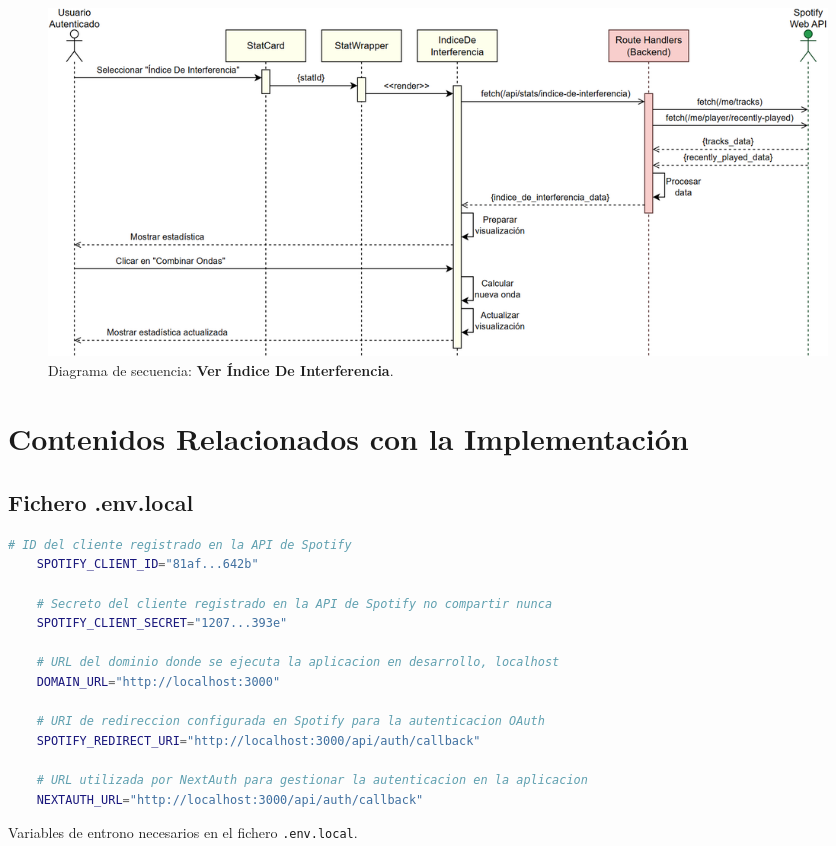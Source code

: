 \begin{figure}[H]
    \centering
    \includegraphics[width=\textwidth]{figures/diagramas_secuencia/ds_ver_indice_de_interferencia.png}
    \caption{Diagrama de secuencia: \textbf{Ver Índice De Interferencia}.}
    \label{fig:ds_ver_indice_de_interferencia}
\end{figure}

\chapter{Contenidos Relacionados con la Implementación} \label{ch:anexoC}

\section*{Fichero .env.local}

\begin{ifalgorithm}[H]
    \begin{lstlisting}[language=bash]
    # ID del cliente registrado en la API de Spotify
    SPOTIFY_CLIENT_ID="81af...642b"

    # Secreto del cliente registrado en la API de Spotify no compartir nunca
    SPOTIFY_CLIENT_SECRET="1207...393e"

    # URL del dominio donde se ejecuta la aplicacion en desarrollo, localhost
    DOMAIN_URL="http://localhost:3000"

    # URI de redireccion configurada en Spotify para la autenticacion OAuth
    SPOTIFY_REDIRECT_URI="http://localhost:3000/api/auth/callback"

    # URL utilizada por NextAuth para gestionar la autenticacion en la aplicacion
    NEXTAUTH_URL="http://localhost:3000/api/auth/callback"
    \end{lstlisting}
    \caption{Variables de entrono necesarios en el fichero \texttt{.env.local}.}
    \label{alg:variables_entorno}
\end{ifalgorithm}

